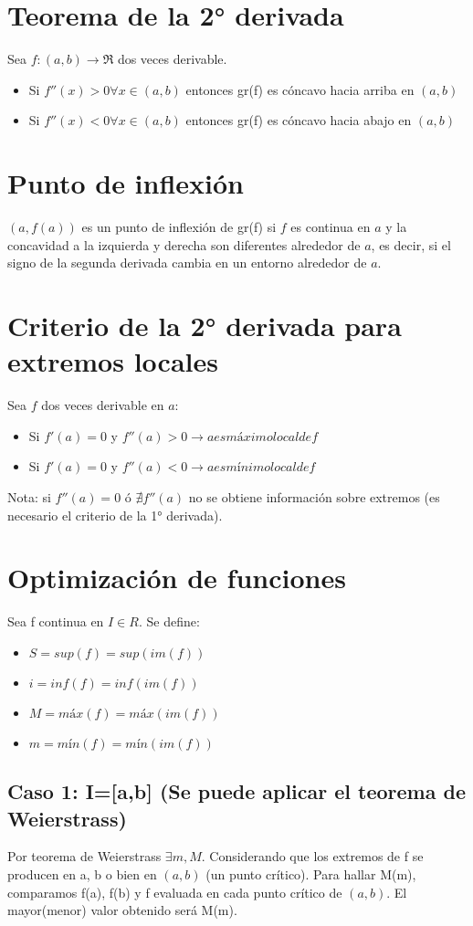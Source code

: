 \documentclass{report}
\begin{document}
	\section{Teorema de la 2° derivada}
		Sea $f:(a,b)\to \Re$ dos veces derivable.
			\begin{itemize}
				\item Si $f''(x)>0 \forall x \in (a,b)$ entonces gr(f) es cóncavo hacia arriba en $(a,b)$
				\item Si $f''(x)<0 \forall x \in (a,b)$ entonces gr(f) es cóncavo hacia abajo en $(a,b)$
			\end{itemize}
	\section{Punto de inflexión}
		$(a,f(a))$ es un punto de inflexión de gr(f) si $f$ es continua en $a$ y la concavidad a la izquierda y derecha son diferentes alrededor de $a$, es decir, si el signo de la segunda derivada cambia en un entorno alrededor de $a$.
	\section{Criterio de la 2° derivada para extremos locales}
		Sea $f$ dos veces derivable en $a$:
		\begin{itemize}
			\item Si $f'(a)=0$ y $f''(a)>0 \rightarrow a es máximo local de f$
			\item Si $f'(a)=0$ y $f''(a)<0 \rightarrow a es mínimo local de f$
		\end{itemize}
		Nota: si $f''(a)=0$ ó $\nexists f''(a)$ no se obtiene información sobre extremos (es necesario el criterio de la 1° derivada).
	\section{Optimización de funciones}
		Sea f continua en $I \in R$. Se define:
		
		\begin{itemize}
			\item $S = sup(f) = sup(im(f))$
			\item $i = inf(f) = inf(im(f))$
			\item $M = máx(f) = máx(im(f))$
			\item $m = mín(f) = mín(im(f))$
		\end{itemize}
	
		\subsection{Caso 1: I=[a,b] (Se puede aplicar el teorema de Weierstrass)}
			Por teorema de Weierstrass $\exists m, M$. Considerando que los extremos de f se producen en a, b o bien en $(a,b)$ (un punto crítico). Para hallar M(m), comparamos f(a), f(b) y f evaluada en cada punto crítico de $(a,b)$. El mayor(menor) valor obtenido será M(m).
		
\end{document}
